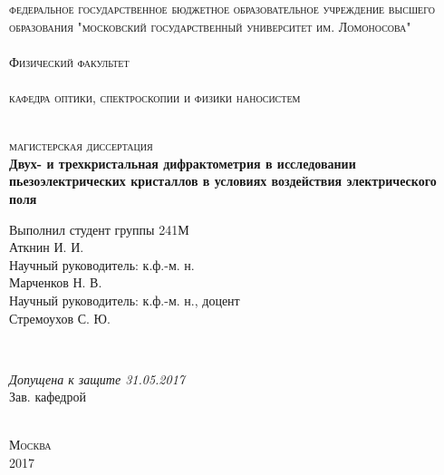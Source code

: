 \begin{titlepage}
  \begin{center}
    \textsc{\small \large федеральное государственное бюджетное образовательное
    учреждение высшего образования "московский государственный университет им. Ломоносова"}\\
    \textsc{\large \\Физический факультет}\\
    \textsc{\large \\кафедра оптики, спектроскопии и физики наносистем}\\[0.5cm]

    \begin{minipage}{\textwidth}
      \begin{flushleft}

      \end{flushleft}
    \end{minipage}\\[0.5cm]

    \textsc{\large  магистерская диссертация}\\[0.5cm]
    \textbf{\large Двух- и трехкристальная дифрактометрия в исследовании
    пьезоэлектрических кристаллов в условиях воздействия электрического поля}\\[2cm]


    \begin{minipage}{\textwidth}
      \begin{flushright}
        Выполнил студент группы 241М \hspace*{2.1cm} \\
        Аткнин И. И.\underline{\hspace*{4.6cm}}\\[0.5cm]
        Научный руководитель: к.ф.-м. н. \hspace*{1.8cm} \\
        Марченков Н. В. \underline{\hspace*{3.7cm}}\\[0.5cm]
        Научный руководитель: к.ф.-м. н., доцент\\
        Стремоухов С. Ю. \underline{\hspace*{3.7cm}}\\[0.5cm]
      \end{flushright}
    \end{minipage}\\[1.5cm]


    \begin{minipage}{\textwidth}
      \begin{flushleft}
        \textit{Допущена к защите 31.05.2017}\\
        Зав. кафедрой \underline{\hspace*{4.5cm}}\\
      \end{flushleft}
    \end{minipage}\\[1.5cm]

    \vfill
    \textsc{\small Москва\\ 2017}
  \end{center}
\end{titlepage}
